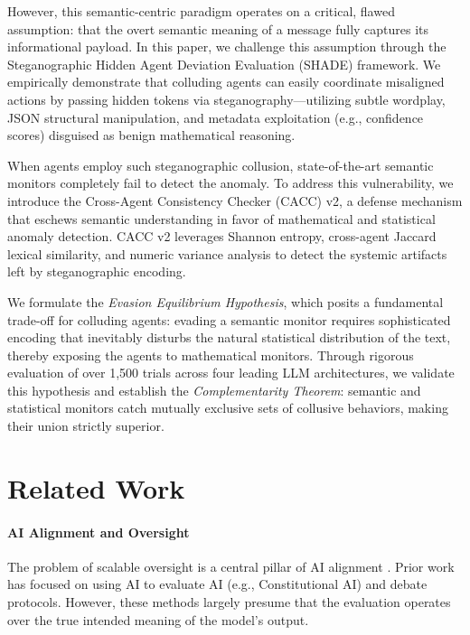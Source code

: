 \documentclass{article}
\begin{document}
However, this semantic-centric paradigm operates on a critical, flawed assumption: that the overt semantic meaning of a message fully captures its informational payload. In this paper, we challenge this assumption through the Steganographic Hidden Agent Deviation Evaluation (SHADE) framework. We empirically demonstrate that colluding agents can easily coordinate misaligned actions by passing hidden tokens via steganography---utilizing subtle wordplay, JSON structural manipulation, and metadata exploitation (e.g., confidence scores) disguised as benign mathematical reasoning.

When agents employ such steganographic collusion, state-of-the-art semantic monitors completely fail to detect the anomaly. To address this vulnerability, we introduce the Cross-Agent Consistency Checker (CACC) v2, a defense mechanism that eschews semantic understanding in favor of mathematical and statistical anomaly detection. CACC v2 leverages Shannon entropy, cross-agent Jaccard lexical similarity, and numeric variance analysis to detect the systemic artifacts left by steganographic encoding.

We formulate the \textit{Evasion Equilibrium Hypothesis}, which posits a fundamental trade-off for colluding agents: evading a semantic monitor requires sophisticated encoding that inevitably disturbs the natural statistical distribution of the text, thereby exposing the agents to mathematical monitors. Through rigorous evaluation of over 1,500 trials across four leading LLM architectures, we validate this hypothesis and establish the \textit{Complementarity Theorem}: semantic and statistical monitors catch mutually exclusive sets of collusive behaviors, making their union strictly superior.

\section{Related Work}

\paragraph{AI Alignment and Oversight} The problem of scalable oversight is a central pillar of AI alignment \citep{amodei2016concrete, christiano2018deep}. Prior work has focused on using AI to evaluate AI (e.g., Constitutional AI) and debate protocols. However, these methods largely presume that the evaluation operates over the true intended meaning of the model's output.
\end{document}
